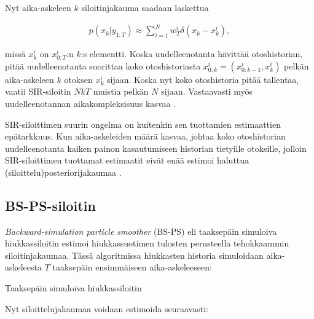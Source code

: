 \documentclass[
  12pt,
  a4paper, twoside]{book}
\begin{document}
Nyt aika-askeleen \(k\) siloitinjakauma saadaan laskettua

\begin{align}\label{siloitin-posteriori-k}
p(x_{k}|y_{1:T}) \approx \sum_{i=1}^N w_T^i \delta (x_{k}-x_{k}^i),
\end{align}

\noindent missä \(x^i_k\) on \(x^i_{0:T}\):n \(k\):s elementti. Koska uudelleenotanta hävittää otoshistorian, pitää uudelleenotanta suorittaa koko otoshistoriasta \(x_{0:k}^i = (x_{0:k-1}^i, x_{k}^i)\) pelkän aika-askeleen \(k\) otoksen \(x_{k}^i\) sijaan. Koska nyt koko otoshistoria pitää tallentaa, vaatii SIR-siloitin \(NkT\) muistia pelkän \(N\) sijaan. Vastaavasti myös uudelleenotannan aikakompleksisuus kasvaa \citep{kitagawa-1996}.

SIR-siloittimen suurin ongelma on kuitenkin sen tuottamien estimaattien epätarkkuus. Kun aika-askeleiden määrä kasvaa, johtaa koko otoshistorian uudelleenotanta kaiken painon kasautumiseen historian tietyille otoksille, jolloin SIR-siloittimen tuottamat estimaatit eivät enää estimoi haluttua (siloittelu)posteriorijakaumaa \citep{kitagawa-1996}.

\subsection{BS-PS-siloitin}

\emph{Backward-simulation particle smoother} (BS-PS) eli taaksepäin simuloiva hiukkassiloitin estimoi hiukkassuotimen tulosten perusteella tehokkaammin siloitinjakaumaa. Tässä algoritmissa hiukkasten historia simuloidaan aika-askeleesta \(T\) taaksepäin ensimmäiseen aika-askeleeseen:

\begin{algorithm}[H]
\label{BSPS}
\DontPrintSemicolon
\SetAlgoShortEnd
{}
\caption{Taaksepäin simuloiva hiukkassiloitin}
\end{algorithm}

Nyt siloittelujakaumaa voidaan estimoida seuraavasti:
\end{document}
